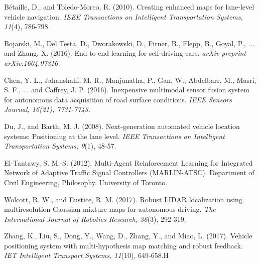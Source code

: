 \documentclass[letterpaper,10pt,draftclsnofoot,onecolumn]{IEEEtran}
\begin{document}
    

\pagebreak
    
\begin{thebibliography}{}
         Bétaille, D., and Toledo-Moreo, R. (2010). Creating enhanced maps for lane-level vehicle navigation. \emph{IEEE Transactions on Intelligent Transportation Systems, 11}(4), 786-798.
        
        Bojarski, M., Del Testa, D., Dworakowski, D., Firner, B., Flepp, B., Goyal, P., ... and Zhang, X. (2016). End to end learning for self-driving cars. \emph{arXiv preprint arXiv:1604.07316.}
        
        Chen, Y. L., Jahanshahi, M. R., Manjunatha, P., Gan, W., Abdelbarr, M., Masri, S. F., ... and Caffrey, J. P. (2016). Inexpensive multimodal sensor fusion system for autonomous data acquisition of road surface conditions. \emph{IEEE Sensors Journal, 16(21), 7731-7743.}
        
         Du, J., and Barth, M. J. (2008). Next-generation automated vehicle location systems: Positioning at the lane level. \emph{IEEE Transactions on Intelligent Transportation Systems, 9}(1), 48-57.
        
        El-Tantawy, S. M.-S. (2012). Multi-Agent Reinforcement Learning for Integrated Network of Adaptive Traffic Signal Controllers (MARLIN-ATSC). Department of Civil Engineering, Philosophy. University of Toronto.
        
        Wolcott, R. W., and Eustice, R. M. (2017). Robust LIDAR localization using multiresolution Gaussian mixture maps for autonomous driving. \emph{The International Journal of Robotics Research, 36}(3), 292-319.
        
        Zhang, K., Liu, S., Dong, Y., Wang, D., Zhang, Y., and Miao, L. (2017). Vehicle positioning system with multi-hypothesis map matching and robust feedback. \emph{IET Intelligent Transport Systems, 11}(10), 649-658.H

\end{thebibliography}
\end{document}
